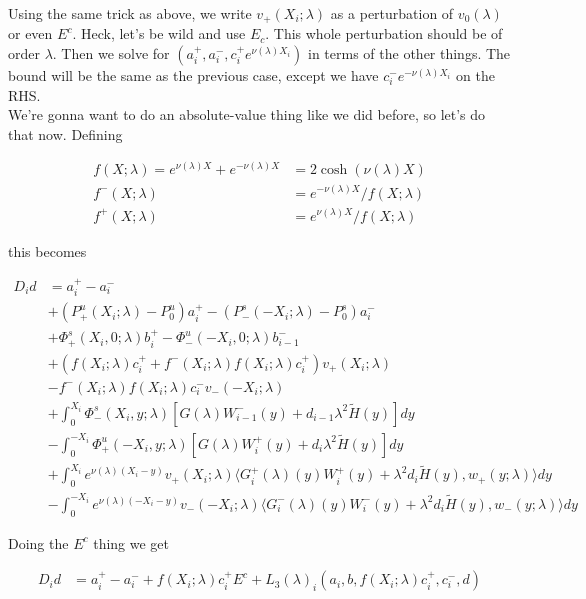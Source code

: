 \documentclass[12pt]{article}
\begin{document}
\begin{enumerate}
Using the same trick as above, we write $v_+(X_i; \lambda)$ as a perturbation of $v_0(\lambda)$ or even $E^c$. Heck, let's be wild and use $E_c$. This whole perturbation should be of order $\lambda$. Then we solve for $(a_i^+, a_i^-, c_i^+ e^{\nu(\lambda)X_i})$ in terms of the other things. The bound will be the same as the previous case, except we have $c_i^- e^{-\nu(\lambda)X_i}$ on the RHS.\\

We're gonna want to do an absolute-value thing like we did before, so let's do that now. Defining

\begin{align*}
f(X; \lambda) = e^{\nu(\lambda)X} + e^{-\nu(\lambda)X} &= 2 \cosh (\nu(\lambda) X) \\
f^-(X; \lambda) &= e^{-\nu(\lambda)X} / f(X; \lambda) \\
f^+(X; \lambda) &= e^{\nu(\lambda)X} / f(X; \lambda)
\end{align*}

this becomes

\begin{align*}
D_i d &= a_i^+ - a_i^- \\
&+ (P^u_+(X_i; \lambda) - P_0^u)a_i^+ - (P^s_-(-X_i; \lambda) - P_0^s)a_i^- \\
&+ \Phi^s_+(X_i, 0; \lambda)b_i^+ - \Phi^u_-(-X_i, 0; \lambda)b_{i-1}^- \\
&+ (f(X_i; \lambda) c_i^+ + f^-(X_i; \lambda) f(X_i; \lambda) c_i^+ ) v_+(X_i; \lambda) \\
&- f^-(X_i; \lambda) f(X_i; \lambda) c_i^- v_-(-X_i; \lambda)\\
&+ \int_0^{X_i} \Phi^s_-(X_i, y; \lambda) [ G(\lambda)W_{i-1}^-(y) + d_{i-1} \lambda^2 \tilde{H}(y) ] dy \\
&- \int_0^{-X_i} \Phi^u_+(-X_i, y; \lambda) [ G(\lambda)W_i^+(y) + d_i \lambda^2 \tilde{H}(y) ] dy \\
&+ \int_{0}^{X_i} e^{\nu(\lambda)(X_i-y)} v_+(X_i; \lambda) \langle G_i^+(\lambda)(y)W_i^+(y) + \lambda^2 d_i \tilde{H}(y), w_+(y; \lambda) \rangle dy \\
&- \int_{0}^{-X_i} 
e^{\nu(\lambda)(-X_i-y)} v_-(-X_i; \lambda) \langle G_i^-(\lambda)(y)W_i^-(y) + \lambda^2 d_i \tilde{H}(y), w_-(y; \lambda) \rangle dy
\end{align*}

Doing the $E^c$ thing we get

\begin{align*}
D_i d &= a_i^+ - a_i^- + f(X_i; \lambda) c_i^+ E^c + L_3(\lambda)_i(a_i, b, f(X_i; \lambda) c_i^+, c_i^-, d)
\end{align*}


\end{enumerate}
\end{document}
